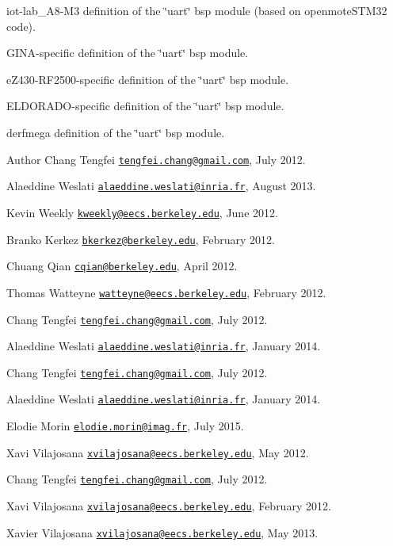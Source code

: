 iot-\/lab\+\_\+\+A8-\/\+M3 definition of the \char`\"{}uart\char`\"{} bsp module (based on openmote\+S\+T\+M32 code).

G\+I\+N\+A-\/specific definition of the \char`\"{}uart\char`\"{} bsp module.

e\+Z430-\/\+R\+F2500-\/specific definition of the \char`\"{}uart\char`\"{} bsp module.

E\+L\+D\+O\+R\+A\+D\+O-\/specific definition of the \char`\"{}uart\char`\"{} bsp module.

derfmega definition of the \char`\"{}uart\char`\"{} bsp module.

\begin{DoxyAuthor}{Author}
Chang Tengfei \href{mailto:tengfei.chang@gmail.com}{\tt tengfei.\+chang@gmail.\+com}, July 2012. 

Alaeddine Weslati \href{mailto:alaeddine.weslati@inria.fr}{\tt alaeddine.\+weslati@inria.\+fr}, August 2013.

Kevin Weekly \href{mailto:kweekly@eecs.berkeley.edu}{\tt kweekly@eecs.\+berkeley.\+edu}, June 2012.

Branko Kerkez \href{mailto:bkerkez@berkeley.edu}{\tt bkerkez@berkeley.\+edu}, February 2012.

Chuang Qian \href{mailto:cqian@berkeley.edu}{\tt cqian@berkeley.\+edu}, April 2012.

Thomas Watteyne \href{mailto:watteyne@eecs.berkeley.edu}{\tt watteyne@eecs.\+berkeley.\+edu}, February 2012.

Chang Tengfei \href{mailto:tengfei.chang@gmail.com}{\tt tengfei.\+chang@gmail.\+com}, July 2012. 

Alaeddine Weslati \href{mailto:alaeddine.weslati@inria.fr}{\tt alaeddine.\+weslati@inria.\+fr}, January 2014.

Chang Tengfei \href{mailto:tengfei.chang@gmail.com}{\tt tengfei.\+chang@gmail.\+com}, July 2012. 

Alaeddine Weslati \href{mailto:alaeddine.weslati@inria.fr}{\tt alaeddine.\+weslati@inria.\+fr}, January 2014. 

Elodie Morin \href{mailto:elodie.morin@imag.fr}{\tt elodie.\+morin@imag.\+fr}, July 2015.

Xavi Vilajosana \href{mailto:xvilajosana@eecs.berkeley.edu}{\tt xvilajosana@eecs.\+berkeley.\+edu}, May 2012.

Chang Tengfei \href{mailto:tengfei.chang@gmail.com}{\tt tengfei.\+chang@gmail.\+com}, July 2012.

Xavi Vilajosana \href{mailto:xvilajosana@eecs.berkeley.edu}{\tt xvilajosana@eecs.\+berkeley.\+edu}, February 2012.

Xavier Vilajosana \href{mailto:xvilajosana@eecs.berkeley.edu}{\tt xvilajosana@eecs.\+berkeley.\+edu}, May 2013. 
\end{DoxyAuthor}


